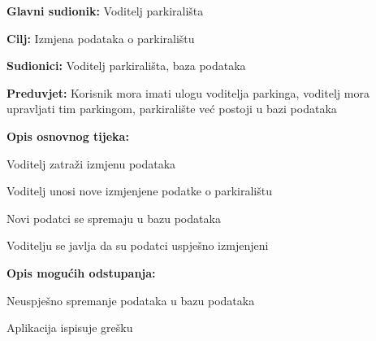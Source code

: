 				   \begin{packed_item}
				   	
				   	\item \textbf{Glavni sudionik: }Voditelj parkirališta
				   	\item  \textbf{Cilj:} Izmjena podataka o parkiralištu
				   	\item  \textbf{Sudionici:} Voditelj parkirališta, baza podataka
				   	\item  \textbf{Preduvjet:} Korisnik mora imati ulogu voditelja parkinga, voditelj mora upravljati tim parkingom, parkiralište već postoji u bazi podataka
				   	\item  \textbf{Opis osnovnog tijeka:}
				   	
				   	\item[] \begin{packed_enum}
				   		
				   		\item Voditelj zatraži izmjenu podataka
				   		\item Voditelj unosi nove izmjenjene podatke o parkiralištu
				   		\item Novi podatci se spremaju u bazu podataka
				   		\item Voditelju se javlja da su podatci uspješno izmjenjeni
				   	\end{packed_enum}
				   	
				   	\item  \textbf{Opis mogućih odstupanja:}
				   	
				   	\item[] \begin{packed_item}
				   		
				   		
				   		
				   		\item[3.a] Neuspješno spremanje podataka u bazu podataka	
				   		\item[] \begin{packed_enum}
				   			
				   			\item Aplikacija ispisuje grešku
				   			
				   		\end{packed_enum}
				   		
				   	\end{packed_item}
				   \end{packed_item}
			    	\noindent {}
